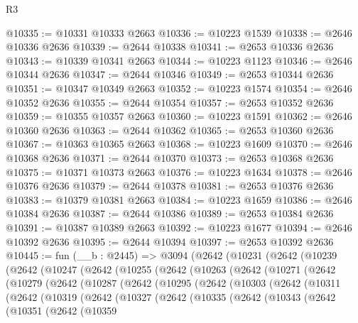\begin{lexlean}{R3}
\begin{coremodule}
@10335 := @10331 @10333 @2663
@10336 := @10223 @1539
@10338 := @2646 @10336 @2636
@10339 := @2644 @10338
@10341 := @2653 @10336 @2636
@10343 := @10339 @10341 @2663
@10344 := @10223 @1123
@10346 := @2646 @10344 @2636
@10347 := @2644 @10346
@10349 := @2653 @10344 @2636
@10351 := @10347 @10349 @2663
@10352 := @10223 @1574
@10354 := @2646 @10352 @2636
@10355 := @2644 @10354
@10357 := @2653 @10352 @2636
@10359 := @10355 @10357 @2663
@10360 := @10223 @1591
@10362 := @2646 @10360 @2636
@10363 := @2644 @10362
@10365 := @2653 @10360 @2636
@10367 := @10363 @10365 @2663
@10368 := @10223 @1609
@10370 := @2646 @10368 @2636
@10371 := @2644 @10370
@10373 := @2653 @10368 @2636
@10375 := @10371 @10373 @2663
@10376 := @10223 @1634
@10378 := @2646 @10376 @2636
@10379 := @2644 @10378
@10381 := @2653 @10376 @2636
@10383 := @10379 @10381 @2663
@10384 := @10223 @1659
@10386 := @2646 @10384 @2636
@10387 := @2644 @10386
@10389 := @2653 @10384 @2636
@10391 := @10387 @10389 @2663
@10392 := @10223 @1677
@10394 := @2646 @10392 @2636
@10395 := @2644 @10394
@10397 := @2653 @10392 @2636
@10445 := fun (__b : @2445) =>
  @3094
    (@2642
      (@10231
        (@2642
          (@10239
            (@2642
              (@10247
                (@2642
                  (@10255
                    (@2642
                      (@10263
                        (@2642
                          (@10271
                            (@2642
                              (@10279
                                (@2642
                                  (@10287
                                    (@2642
                                      (@10295
                                        (@2642
                                          (@10303
                                            (@2642
                                              (@10311
                                                (@2642
                                                  (@10319
                                                    (@2642
                                                      (@10327
                                                        (@2642
                                                          (@10335
                                                            (@2642
                                                              (@10343
                                                                (@2642
                                                                  (@10351
                                                                    (@2642
                                                                      (@10359

\end{coremodule}
\end{lexlean}

